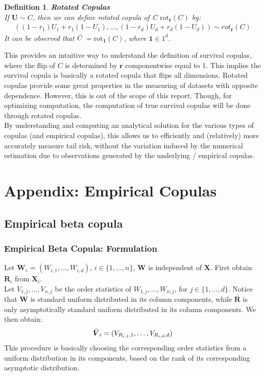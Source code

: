\documentclass[12pt]{report}
\newtheorem{definition}{Definition}[subsection]
\newcommand{\1}{\mathbf{1}}
\begin{document}
\begin{definition}\label{RotatedCopulaProperties}
\textit{\normalfont\parencite{HofertBook}}
\:\textbf{Rotated Copulas} \\
If $\boldsymbol{U} \sim C$, then we can define rotated copula of C $\mathrm{rot}_{\boldsymbol{r}}(C)$ by:
\begin{align*}
\left( (1 - r_{1})U_{1} + r_{1}(1 - U_{1}), \dots, (1 - r_{d})U_{d} + r_{d}(1 - U_{d}) \right) \sim rot_{\boldsymbol{r}}(C)
\end{align*}
It can be observed that $\Bar{C}$ = $\mathrm{rot}_{\boldsymbol{1}}(C)$, where $\boldsymbol{1} \in 1^{d}$.
\end{definition}

This provides an intuitive way to understand the definition of survival copulas, where the flip of $C$ is determined by $\boldsymbol{r}$ componentwise equal to 1. This implies the survival copula is basically a rotated copula that flips all dimensions. Rotated copulas provide some great properties in the measuring of datasets with opposite dependence. However, this is out of the scope of this report. Though, for optimizing computation, the computation of true survival copulas will be done through rotated copulas.\\
\vspace{0.5cm}
By understanding and computing an analytical solution for the various types of copulas (and empirical copulas), this allows us to efficiently and (relatively) more accurately measure tail risk, without the variation induced by the numerical estimation due to observations generated by the underlying / empirical copulas. 

\section{Appendix: Empirical Copulas}
\subsection{Empirical beta copula}
\subsubsection{Empirical Beta Copula: Formulation}
\vspace{0.5cm}
Let $\boldsymbol{W}_{i}$ = $(W_{i,1}, \dots, W_{i,d})$, \: $i \in \{1, \dots, n \}$, $\boldsymbol{W}$ is independent of $\boldsymbol{X}$. First obtain $\boldsymbol{R}_{i}$ from $\boldsymbol{X}_{i}$.\\
\vspace{0.5cm}
Let $V_{1,j}, \dots, V_{n,j}$ be the order statistics of $W_{1,j}, \dots, W_{n,j}$, for $j \in \{ 1, \dots, d \}$. Notice that $\boldsymbol{W}$ is standard uniform distributed in its column components, while $\boldsymbol{R}$ is only asymptotically standard uniform distributed in its column components. We then obtain:
\begin{align*}
\Hat{\boldsymbol{V}}_{i} = (V_{R_{i,1},1}, \dots, V_{R_{i,d},d})    
\end{align*}
This procedure is basically choosing the corresponding order statistics from a uniform distribution in its components, based on the rank of its corresponding asymptotic distribution. 
\end{document}
